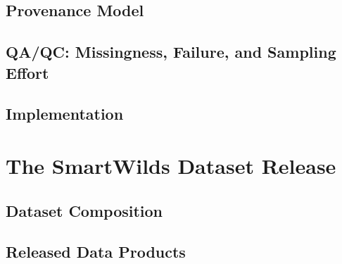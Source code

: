 \documentclass[manuscript]{acmart}
\begin{document}

\subsection{Provenance Model}


\subsection{QA/QC: Missingness, Failure, and Sampling Effort}


\subsection{Implementation}

%

\newpage
\section{The SmartWilds Dataset Release}
\label{sec:dataset}

\subsection{Dataset Composition}


\subsection{Released Data Products}

\end{document}
